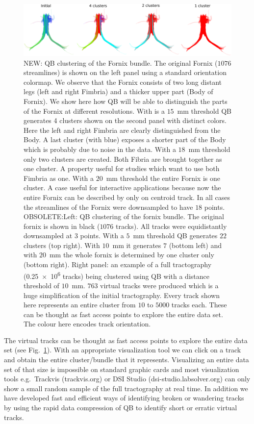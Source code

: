 \documentclass{bioinfo}
\begin{document}
\begin{figure}[htp]
\centerline{\includegraphics[width=160mm]{Figures/Fig_6_QB_fornix}}
\caption{NEW: QB clustering of the Fornix bundle. The original Fornix ($1076$ streamlines) is shown on the left panel using a standard orientation colormap. We observe that the Fornix consists of two long distant legs (left and right Fimbria) and a thicker upper part (Body of Fornix). We show here how QB will be able to distinguish the parts of the Fornix at different resolutions. With is a $15$~mm threshold QB generates 4 clusters shown on the second panel with distinct colors. Here the left and right Fimbria are clearly distinguished from the Body. A last cluster (with blue) exposes a shorter part of the Body which is probably due to noise in the data. With a $18$~mm threshold only two clusters are created. Both Fibria are brought together as one cluster. A property useful for studies which want to use both Fimbria as one. With a $20$~mm threshold the entire Fornix is one cluster. A case useful for interactive applications because now the entire Fornix can be described by only on centroid track. In all cases the streamlines of the Fornix were downsampled to have $18$ points.  OBSOLETE:Left: QB clustering of the fornix bundle. The original fornix
  is shown in black ($1076$ tracks). All tracks were equidistantly
  downsampled at $3$ points. With a $5$~mm threshold QB generates $22$
  clusters (top right). With $10$~mm it generates $7$ (bottom left) and
  with $20$~mm the whole fornix is determined by one cluster only
  (bottom right). Right panel: an example of a full tractography
  (\num{0.25e6} tracks) being clustered using QB with a distance
  threshold of $10$~mm. $763$ virtual tracks were produced which is a
  huge simplification of the initial tractography. Every track shown
  here represents an entire cluster from $10$ to $5000$ tracks
  each. These can be thought as fast access points to explore the entire
  data set. The colour here encodes track
  orientation.\label{Flo:QB_fornix}}
\end{figure}

The virtual tracks can be thought as fast access points to explore the
entire data set (see Fig.~\ref{Flo:QB_fornix}). With an appropriate
visualization tool we can click on a track and obtain the entire
cluster/bundle that it represents. Visualizing an entire data set of
that size is impossible on standard graphic cards and most visualization
tools e.g.~Trackvis (trackvis.org) or DSI Studio
(dsi-studio.labsolver.org) can only show a small random sample of the
full tractography at real time. In addition we have developed fast and
efficient ways of identifying broken or wandering tracks by using the
rapid data compression of QB to identify short or erratic virtual
tracks.
\end{document}

